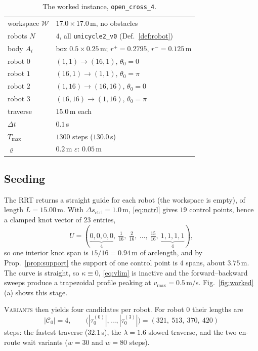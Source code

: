 \documentclass[conference]{IEEEtran}
\newcommand{\W}{\mathcal{W}}
\newcommand{\Cand}{\mathcal{C}}
\newcommand{\clr}{\varepsilon}
\begin{document}
\begin{table}[t]
\caption{The worked instance, \texttt{open\_cross\_4}.}
\label{tab:instance}
\centering
\small
\begin{tabular}{ll}
\toprule
workspace $\W$ & $17.0 \times 17.0$\,m, no obstacles \\
robots $N$ & $4$, all \texttt{unicycle2\_v0} (Def.~\ref{def:robot}) \\
body $A_i$ & box $0.5 \times 0.25$\,m; $r^{+}=0.2795$, $r^{-}=0.125$\,m \\
robot $0$ & $(1,1) \rightarrow (16,1)$, $\theta_0 = 0$ \\
robot $1$ & $(16,1) \rightarrow (1,1)$, $\theta_0 = \pi$ \\
robot $2$ & $(1,16) \rightarrow (16,16)$, $\theta_0 = 0$ \\
robot $3$ & $(16,16) \rightarrow (1,16)$, $\theta_0 = \pi$ \\
traverse & $15.0$\,m each \\
$\Delta t$ & $0.1$\,s \\
$T_{\max}$ & $1300$ steps ($130.0$\,s) \\
$\varrho$ & $0.2$\,m \hfill $\clr$: $0.05$\,m \\
\bottomrule
\end{tabular}
\end{table}

\subsection{Seeding}

The RRT returns a straight guide for each robot (the workspace is empty), of length
$L = 15.00$\,m. With $\Delta s_{\text{ctrl}} = 1.0$\,m, \eqref{eq:nctrl} gives $19$ control
points, hence a clamped knot vector of $23$ entries,
\[
  U = (\underbrace{0,0,0,0}_{4},\ \tfrac{1}{16},\ \tfrac{2}{16},\ \dots,\ \tfrac{15}{16},\
       \underbrace{1,1,1,1}_{4}),
\]
so one interior knot span is $15/16 = 0.94$\,m of arclength, and by
Prop.~\ref{prop:support} the support of one control point is $4$ spans, about $3.75$\,m.
The curve is straight, so $\kappa \equiv 0$, \eqref{eq:vlim} is inactive and the
forward--backward sweeps produce a trapezoidal profile peaking at
$v_{\max} = 0.5$\,m/s. Fig.~\ref{fig:worked}(a) shows this stage.

\textsc{Variants} then yields four candidates per robot. For robot $0$ their lengths are
\[
  |\Cand_0| = 4, \qquad
  \big(|\tau_0^{(0)}|,\dots,|\tau_0^{(3)}|\big) = (321,\ 513,\ 370,\ 420)
\]
steps: the fastest traverse ($32.1$\,s), the $\lambda = 1.6$ slowed traverse, and the two
en-route wait variants ($w = 30$ and $w = 80$ steps).
\end{document}

